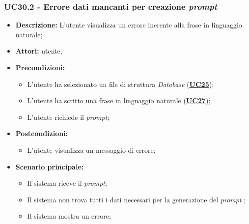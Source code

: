 \subsubsection{UC30.2 - Errore dati mancanti per creazione \textit{prompt}}
\label{sec:UC30.2}
\begin{itemize}
	\item \textbf{Descrizione:} L’utente visualizza un errore inerente alla frase in linguaggio naturale;
	\item \textbf{Attori:} utente;
	\item \textbf{Precondizioni:} 
	\begin{itemize}
		\item L’utente ha selezionato un file di struttura \textit{Database} (\hyperref[sec:UC25]{\textbf{UC25}});
		\item L’utente ha scritto una frase in linguaggio naturale (\hyperref[sec:UC27]{\textbf{UC27}});
		\item L’utente richiede il \textit{prompt};
	\end{itemize}
	\item \textbf{Postcondizioni:} 
	\begin{itemize}
		\item L’utente visualizza un messaggio di errore;
	\end{itemize}
	\item \textbf{Scenario principale:} 
	\begin{itemize}
		\item Il sistema riceve il \textit{prompt};
		\item Il sistema non trova tutti i dati necessari per la generazione del \textit{prompt} ;
		\item Il sistema mostra un errore;
	\end{itemize}
\end{itemize}

